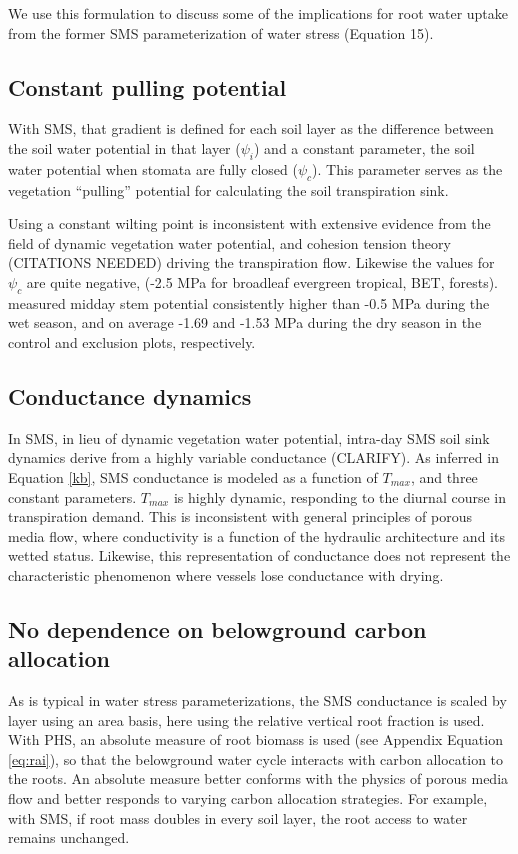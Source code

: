 \documentclass[draft,linenumbers]{agujournal}
\begin{document}
   We use this formulation to discuss some of the implications for root water uptake from the former SMS parameterization of water stress (Equation 15).
   
   
    
    \subsection{Constant pulling potential}
    With SMS, that gradient is defined for each soil layer as the difference between the soil water potential in that layer ($\psi_i$) and a constant parameter, the soil water potential when stomata are fully closed ($\psi_{c}$). This parameter serves as the vegetation ``pulling'' potential for calculating the soil transpiration sink.
    
    Using a constant wilting point is inconsistent with extensive evidence from the field of dynamic vegetation water potential, and cohesion tension theory (CITATIONS NEEDED) driving the transpiration flow. Likewise the values for $\psi_{c}$ are quite negative, (-2.5 MPa for broadleaf evergreen tropical, BET, forests). \cite{fisher2006} measured midday stem potential consistently higher than -0.5 MPa during the wet season, and on average -1.69 and -1.53 MPa during the dry season in the control and exclusion plots, respectively.
    
    \subsection{Conductance dynamics}
    In SMS, in lieu of dynamic vegetation water potential, intra-day SMS soil sink dynamics derive from a highly variable conductance (CLARIFY).    As inferred in Equation \ref{kb}, SMS conductance is modeled as a function of $T_{max}$, and three constant parameters.    $T_{max}$ is highly dynamic, responding to the diurnal course in transpiration demand.    This is inconsistent with general principles of porous media flow, where conductivity is a function of the hydraulic architecture and its wetted status.    Likewise, this representation of conductance does not represent the characteristic phenomenon where vessels lose conductance with drying.
      
    \subsection{No dependence on belowground carbon allocation}
    As is typical in water stress parameterizations, the SMS conductance is scaled by layer using an area basis, here using the relative vertical root fraction is used. With PHS, an absolute measure of root biomass is used (see Appendix Equation \ref{eq:rai}), so that the belowground water cycle interacts with carbon allocation to the roots. An absolute measure better conforms with the physics of porous media flow and better responds to varying carbon allocation strategies. For example, with SMS, if root mass doubles in every soil layer, the root access to water remains unchanged.
\end{document}
